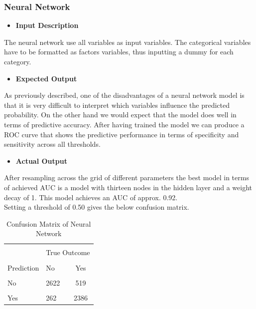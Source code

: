   	\subsubsection{Neural Network}
  	\begin{itemize}
  		\item \textbf{Input Description}
  	\end{itemize}
  	\noindent The neural network use all variables as input variables. The categorical variables have to be formatted as factors variables, thus inputting a dummy for each category. 
  	\begin{itemize}
  		\item \textbf{Expected Output}
  	\end{itemize}
  	As previously described, one of the disadvantages of a neural network model is that it is very difficult to interpret which variables influence the predicted probability. On the other hand we would expect that the model does well in terms of predictive accuracy. After having trained the model we can produce a ROC curve that shows the predictive performance in terms of specificity and sensitivity across all thresholds.\\   
  	\begin{itemize}
  		\item \textbf{Actual Output}
  	\end{itemize}
  	\noindent After resampling across the grid of different parameters the best model in terms of achieved AUC is a model with thirteen nodes in the hidden layer and a weight decay of 1. This model achieves an AUC of approx. 0.92.\\
  	Setting a threshold of 0.50 gives the below confusion matrix.

\begin{center}
\begin{table}[!htbp]
	\centering  
	\begin{tabular}{llc}
		\hline
		\hline\\[-1.8ex]
		& \multicolumn{2}{c}{True Outcome} \\
		\cline{2-3}\\[-1.8ex]
		Prediction & No & Yes \\
		\hline \\[-1.8ex] 
		No & 2622 & 519 \\ 
		\hline \\[-1.8ex] 
		Yes& 262 & 2386\\ 
		\hline
		\hline
	\end{tabular}  
	\caption{Confusion Matrix of Neural Network} 
\end{table}
\end{center}
 
